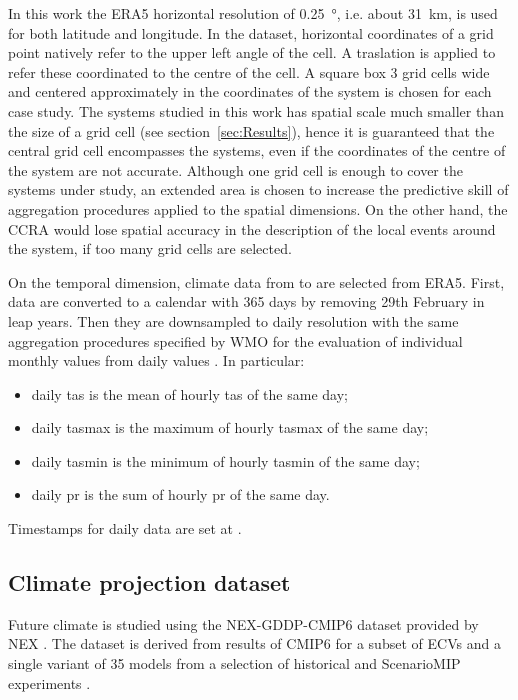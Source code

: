 In this work the ERA5 horizontal resolution of \qty{0.25}{\degree}, i.e. about \qty{31}{\kilo\metre}, is used for both latitude and longitude. In the dataset, horizontal coordinates of a grid point natively refer to the upper left angle of the cell. A traslation is applied to refer these coordinated to the centre of the cell. A square box 3 grid cells wide and centered approximately in the coordinates of the system is chosen for each case study. The systems studied in this work has spatial scale much smaller than the size of a grid cell (see section~\ref{sec:Results}), hence it is guaranteed that the central grid cell encompasses the systems, even if the coordinates of the centre of the system are not accurate. Although one grid cell is enough to cover the systems under study, an extended area is chosen to increase the predictive skill of aggregation procedures applied to the spatial dimensions. On the other hand, the \gls{CCRA} would lose spatial accuracy in the description of the local events around the system, if too many grid cells are selected.

On the temporal dimension, climate data from  to  are selected from ERA5. First, data are converted to a calendar with 365 days by removing 29th February in leap years. Then they are downsampled to daily resolution with the same aggregation procedures specified by \gls{WMO} for the evaluation of individual monthly values from daily values \cite[5]{2017WorldMeteorologicalOrganizationWMOWMOGuidelines}. In particular:
\begin{itemize}
  \item daily \glsdesc{tas} is the mean of hourly \glsdesc{tas} of the same day;
  \item daily \glsdesc{tasmax} is the maximum of hourly \glsdesc{tasmax} of the same day;
  \item daily \glsdesc{tasmin} is the minimum of hourly \glsdesc{tasmin} of the same day;
  \item daily \glsdesc{pr} is the sum of hourly \glsdesc{pr} of the same day.
\end{itemize}
Timestamps for daily data are set at .



\subsection{Climate projection dataset}
Future climate is studied using the NEX-GDDP-CMIP6 dataset provided by \gls{NEX} \cite{2022ThrasherNASAGlobal,2021ThrasherNEX-GDDP-CMIP6}. The dataset is derived from results of \gls{CMIP6} for a subset of \glspl{ECV} and a single variant of 35 models from a selection of historical and ScenarioMIP experiments \cite{2016EyringOverviewOf}.


